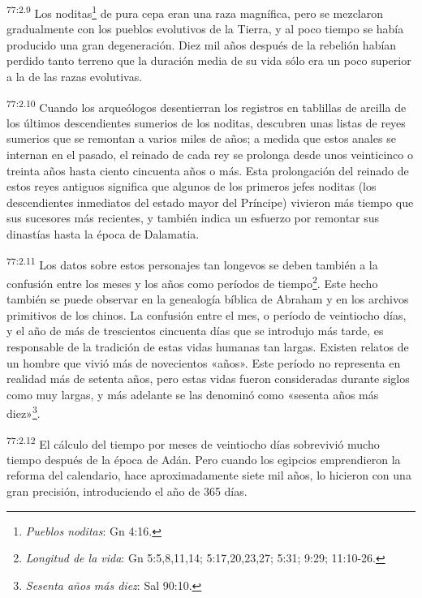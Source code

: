 \par
\textsuperscript{77:2.9} Los noditas\footnote{\textit{Pueblos noditas}: Gn 4:16.} de pura cepa eran una raza magnífica, pero se mezclaron gradualmente con los pueblos evolutivos de la Tierra, y al poco tiempo se había producido una gran degeneración. Diez mil años después de la rebelión habían perdido tanto terreno que la duración media de su vida sólo era un poco superior a la de las razas evolutivas.

\par
\textsuperscript{77:2.10} Cuando los arqueólogos desentierran los registros en tablillas de arcilla de los últimos descendientes sumerios de los noditas, descubren unas listas de reyes sumerios que se remontan a varios miles de años; a medida que estos anales se internan en el pasado, el reinado de cada rey se prolonga desde unos veinticinco o treinta años hasta ciento cincuenta años o más. Esta prolongación del reinado de estos reyes antiguos significa que algunos de los primeros jefes noditas (los descendientes inmediatos del estado mayor del Príncipe) vivieron más tiempo que sus sucesores más recientes, y también indica un esfuerzo por remontar sus dinastías hasta la época de Dalamatia.

\par
\textsuperscript{77:2.11} Los datos sobre estos personajes tan longevos se deben también a la confusión entre los meses y los años como períodos de tiempo\footnote{\textit{Longitud de la vida}: Gn 5:5,8,11,14; 5:17,20,23,27; 5:31; 9:29; 11:10-26.}. Este hecho también se puede observar en la genealogía bíblica de Abraham y en los archivos primitivos de los chinos. La confusión entre el mes, o período de veintiocho días, y el año de más de trescientos cincuenta días que se introdujo más tarde, es responsable de la tradición de estas vidas humanas tan largas. Existen relatos de un hombre que vivió más de novecientos «años». Este período no representa en realidad más de setenta años, pero estas vidas fueron consideradas durante siglos como muy largas, y más adelante se las denominó como «sesenta años más diez»\footnote{\textit{Sesenta años más diez}: Sal 90:10.}.

\par
\textsuperscript{77:2.12} El cálculo del tiempo por meses de veintiocho días sobrevivió mucho tiempo después de la época de Adán. Pero cuando los egipcios emprendieron la reforma del calendario, hace aproximadamente siete mil años, lo hicieron con una gran precisión, introduciendo el año de 365 días.

